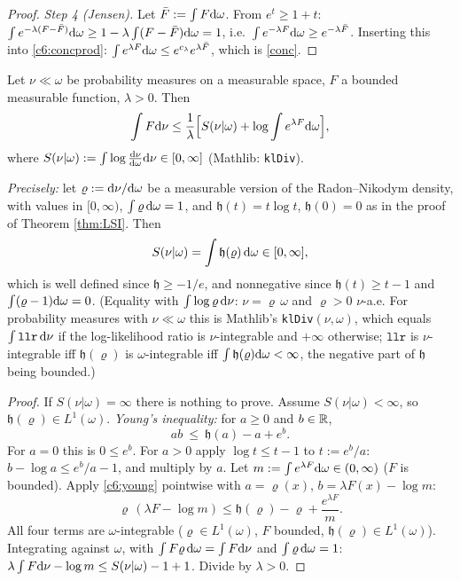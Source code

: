 \begin{proof}
\emph{Step 4 (Jensen).} Let $\bar F:=\int F\mathrm{d}\omega$. From $e^t\ge1+t$: $\int e^{-\lambda(F-\bar F)}\mathrm{d}\omega\ge1-\lambda\int(F-\bar F)\mathrm{d}\omega=1$, i.e.\ $\int e^{-\lambda F}\mathrm{d}\omega\ge e^{-\lambda\bar F}$. Inserting this into \eqref{c6:concprod}:
$\int e^{\lambda F}\mathrm{d}\omega\le e^{c_\lambda}e^{\lambda\bar F}$, which is \eqref{conc}.
\end{proof}

\begin{lemma}\label{lem:DV}
Let $\nu\ll\omega$ be probability measures on a measurable space, $F$ a bounded measurable function, $\lambda>0$. Then
\[\int F\mathrm{d}\nu\le\frac1\lambda\Big[S(\nu|\omega)+\log\int e^{\lambda F}\mathrm{d}\omega\Big],\]
where $S(\nu|\omega):=\int\log\frac{\mathrm{d}\nu}{\mathrm{d}\omega}\mathrm{d}\nu\in[0,\infty]$ (Mathlib: \texttt{klDiv}).
\end{lemma}

\noindent\emph{Precisely:} let $\varrho:=\mathrm{d}\nu/\mathrm{d}\omega$ be a measurable version of the Radon--Nikodym density, with values in $[0,\infty)$, $\int\varrho\,\mathrm{d}\omega=1$, and $\mathfrak h(t)=t\log t$, $\mathfrak h(0)=0$ as in the proof of Theorem \ref{thm:LSI}. Then
\[S(\nu|\omega)=\int\mathfrak h(\varrho)\,\mathrm{d}\omega\in[0,\infty],\]
which is well defined since $\mathfrak h\ge-1/e$, and nonnegative since $\mathfrak h(t)\ge t-1$ and $\int(\varrho-1)\mathrm{d}\omega=0$. (Equality with $\int\log\varrho\,\mathrm{d}\nu$: $\nu=\varrho\,\omega$ and $\varrho>0$ $\nu$-a.e. For probability measures with $\nu\ll\omega$ this is Mathlib's \texttt{klDiv}$(\nu,\omega)$, which equals $\int\texttt{llr}\,\mathrm{d}\nu$ if the log-likelihood ratio is $\nu$-integrable and $+\infty$ otherwise; $\texttt{llr}$ is $\nu$-integrable iff $\mathfrak h(\varrho)$ is $\omega$-integrable iff $\int\mathfrak h(\varrho)\mathrm{d}\omega<\infty$, the negative part of $\mathfrak h$ being bounded.)

\begin{proof}
If $S(\nu|\omega)=\infty$ there is nothing to prove. Assume $S(\nu|\omega)<\infty$, so $\mathfrak h(\varrho)\in L^1(\omega)$.
\emph{Young's inequality:} for $a\ge0$ and $b\in\mathbb{R}$,
\begin{equation}\label{c6:young}
ab\ \le\ \mathfrak h(a)-a+e^b .
\end{equation}
For $a=0$ this is $0\le e^b$. For $a>0$ apply $\log t\le t-1$ to $t:=e^b/a$: $b-\log a\le e^b/a-1$, and multiply by $a$.
Let $m:=\int e^{\lambda F}\mathrm{d}\omega\in(0,\infty)$ ($F$ is bounded). Apply \eqref{c6:young} pointwise with $a=\varrho(x)$, $b=\lambda F(x)-\log m$:
\[\varrho\,(\lambda F-\log m)\le\mathfrak h(\varrho)-\varrho+\frac{e^{\lambda F}}m .\]
All four terms are $\omega$-integrable ($\varrho\in L^1(\omega)$, $F$ bounded, $\mathfrak h(\varrho)\in L^1(\omega)$). Integrating against $\omega$, with $\int F\varrho\,\mathrm{d}\omega=\int F\mathrm{d}\nu$ and $\int\varrho\,\mathrm{d}\omega=1$:
$\lambda\int F\mathrm{d}\nu-\log m\le S(\nu|\omega)-1+1$. Divide by $\lambda>0$.
\end{proof}

